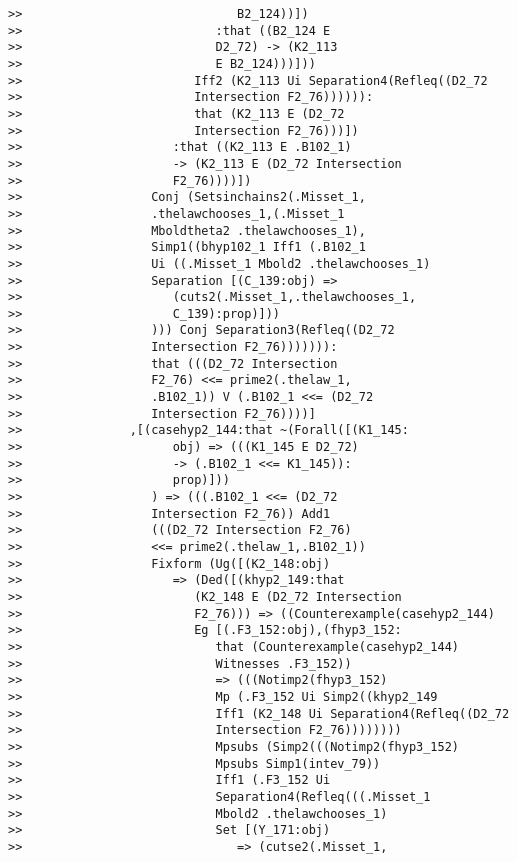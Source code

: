 \documentclass[12pt]{article}
\begin{document}
\begin{verbatim}
>>                              B2_124))])
>>                           :that ((B2_124 E
>>                           D2_72) -> (K2_113
>>                           E B2_124)))]))
>>                        Iff2 (K2_113 Ui Separation4(Refleq((D2_72
>>                        Intersection F2_76)))))):
>>                        that (K2_113 E (D2_72
>>                        Intersection F2_76)))])
>>                     :that ((K2_113 E .B102_1)
>>                     -> (K2_113 E (D2_72 Intersection
>>                     F2_76))))])
>>                  Conj (Setsinchains2(.Misset_1,
>>                  .thelawchooses_1,(.Misset_1
>>                  Mboldtheta2 .thelawchooses_1),
>>                  Simp1((bhyp102_1 Iff1 (.B102_1
>>                  Ui ((.Misset_1 Mbold2 .thelawchooses_1)
>>                  Separation [(C_139:obj) =>
>>                     (cuts2(.Misset_1,.thelawchooses_1,
>>                     C_139):prop)]))
>>                  ))) Conj Separation3(Refleq((D2_72
>>                  Intersection F2_76))))))):
>>                  that (((D2_72 Intersection
>>                  F2_76) <<= prime2(.thelaw_1,
>>                  .B102_1)) V (.B102_1 <<= (D2_72
>>                  Intersection F2_76))))]
>>               ,[(casehyp2_144:that ~(Forall([(K1_145:
>>                     obj) => (((K1_145 E D2_72)
>>                     -> (.B102_1 <<= K1_145)):
>>                     prop)]))
>>                  ) => (((.B102_1 <<= (D2_72
>>                  Intersection F2_76)) Add1
>>                  (((D2_72 Intersection F2_76)
>>                  <<= prime2(.thelaw_1,.B102_1))
>>                  Fixform (Ug([(K2_148:obj)
>>                     => (Ded([(khyp2_149:that
>>                        (K2_148 E (D2_72 Intersection
>>                        F2_76))) => ((Counterexample(casehyp2_144)
>>                        Eg [(.F3_152:obj),(fhyp3_152:
>>                           that (Counterexample(casehyp2_144)
>>                           Witnesses .F3_152))
>>                           => (((Notimp2(fhyp3_152)
>>                           Mp (.F3_152 Ui Simp2((khyp2_149
>>                           Iff1 (K2_148 Ui Separation4(Refleq((D2_72
>>                           Intersection F2_76))))))))
>>                           Mpsubs (Simp2(((Notimp2(fhyp3_152)
>>                           Mpsubs Simp1(intev_79))
>>                           Iff1 (.F3_152 Ui
>>                           Separation4(Refleq(((.Misset_1
>>                           Mbold2 .thelawchooses_1)
>>                           Set [(Y_171:obj)
>>                              => (cutse2(.Misset_1,

\end{verbatim}
\end{document}
